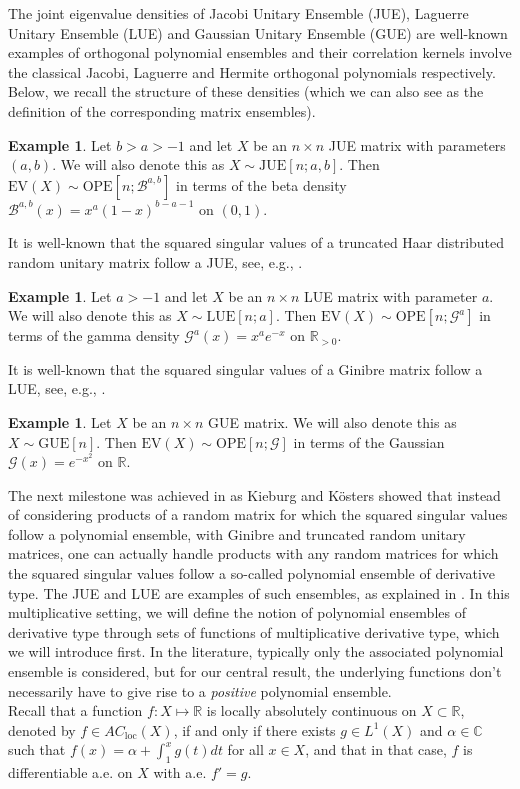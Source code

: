 \documentclass[a4paper,12pt,oneside]{article}
\theoremstyle{definition}
\newtheorem{ex}[defi]{Example}
\newcommand{\C}{\mathbb{C}}
\newcommand{\R}{\mathbb{R}}
\begin{document}
The joint eigenvalue densities of Jacobi Unitary Ensemble (JUE), Laguerre Unitary Ensemble (LUE) and Gaussian Unitary Ensemble (GUE) are well-known examples of orthogonal polynomial ensembles and their correlation kernels involve the classical Jacobi, Laguerre and Hermite orthogonal polynomials respectively. Below, we recall the structure of these densities (which we can also see as the definition of the corresponding matrix ensembles).

\begin{ex}
Let $b>a>-1$ and let $X$ be an $n\times n$ JUE matrix with parameters $(a,b)$. We will also denote this as $X\sim\text{JUE}[n;a,b]$. Then $\text{EV}(X)\sim\text{OPE}[n;\mathcal{B}^{a,b}]$ in terms of the beta density $\mathcal{B}^{a,b}(x) = x^{a}(1-x)^{b-a-1}$ on $(0,1)$.
\end{ex}

It is well-known that the squared singular values of a truncated Haar distributed random unitary matrix follow a JUE, see, e.g., \cite[\S 3.1]{KS:gin_prod}.

\begin{ex}
Let $a>-1$ and let $X$ be an $n\times n$ LUE matrix with parameter $a$. We will also denote this as $X\sim\text{LUE}[n;a]$. Then $\text{EV}(X)\sim\text{OPE}[n;\mathcal{G}^a]$ in terms of the gamma density $ \mathcal{G}^a(x) = x^a e^{-x}$ on $\R_{>0}$.
\end{ex}

It is well-known that the squared singular values of a Ginibre matrix follow a LUE, see, e.g., \cite[\S 3.3]{KS:gin_prod}.

\begin{ex}
Let $X$ be an $n\times n$ GUE matrix. We will also denote this as $X\sim\text{GUE}[n]$. Then $\text{EV}(X)\sim\text{OPE}[n;\mathcal{G}]$ in terms of the Gaussian $ \mathcal{G}(x) = e^{-x^2}$ on $\R$.
\end{ex}

The next milestone was achieved in \cite{KK:SV_EV} as Kieburg and Kösters showed that instead of considering products of a random matrix for which the squared singular values follow a polynomial ensemble, with Ginibre and truncated random unitary matrices, one can actually handle products with any random matrices for which the squared singular values follow a so-called polynomial ensemble of derivative type. The JUE and LUE are examples of such ensembles, as explained in \cite[Ex. 2.4 $d)$ \& $c)$]{FKK:PolyaE}. In this multiplicative setting, we will define the notion of polynomial ensembles of derivative type through sets of functions of multiplicative derivative type, which we will introduce first. In the literature, typically only the associated polynomial ensemble is considered, but for our central result, the underlying functions don't necessarily have to give rise to a \textit{positive} polynomial ensemble. \\
Recall that a function $f:X\mapsto\R$ is locally absolutely continuous on $X\subset\R$, denoted by $f\in AC_{\text{loc}}(X)$, if and only if there exists $g\in L^1(X)$ and $\alpha\in\C$ such that $f(x) = \alpha + \int_1^x g(t) dt $ for all $x\in X$, and that in that case, $f$ is differentiable a.e. on $X$ with a.e. $f'=g$.
\end{document}
